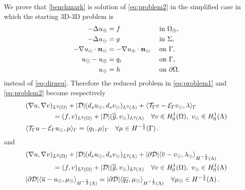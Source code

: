We prove that \eqref{benchmark} is solution of \eqref{eq:problem2} in the
simplified case in which the starting 3D-3D problem is
\begin{subequations}\label{eq:dirneu_simple}
\begin{align}
- \Delta u_{\oplus}  &= f  && \text{ in } \Omega_{\oplus},\\
- \Delta u_{\ominus} &= g  && \text{ in } \Sigma,\\
-\nabla u_{\ominus} \cdot \boldsymbol n_{\ominus} &= -\nabla u_{\oplus} \cdot \boldsymbol n_{\ominus}  && \text{ on } \Gamma,\\
u_{\ominus} - u_{\oplus} &= q_i  && \text{ on }  \Gamma,\\
u_{\oplus} &= h && \text{ on } \partial \Omega.
\end{align}
\end{subequations}
instead of \eqref{eq:dirneu}. Therefore the reduced problem in \eqref{eq:problem1} and
\eqref{eq:problem2} become respectively
%
\begin{subequations}\label{eq:problem1_simple}
\begin{align}
\label{eq:problem1_simple_eq1}
&(\nabla u,\nabla v)_{L^2(\Omega)} + |{\cal D}|(d_s \ud,d_s \vd)_{L^2(\Lambda)} 
+ \langle \trace{v}  - \ext{\vd}, \lambda \rangle_\Gamma
\\
\nonumber
&\qquad\qquad= (f,v)_{L^2(\Omega)} + |{\cal D}| (\avrd{g},\vd)_{L^2(\Lambda)}
\quad \forall v \in H^1_0(\Omega), \ \vd \in H^1_0(\Lambda)
\\
\label{eq:problem1_simple_eq2}
&   \langle \trace{u} - \ext{\ud} , \mu \rangle_\Gamma =  \langle q_1 , \mu \rangle_\Gamma
\quad \forall \mu \in H^{-\frac12}(\Gamma)\,.
\end{align}
\end{subequations}
and
\begin{subequations}\label{eq:problem2_simple}
  \begin{align}
    \label{eq:problem2_simple_eq1}
&(\nabla u,\nabla v)_{L^2(\Omega)} + |{\cal D}|(d_s \ud,d_s \vd)_{L^2(\Lambda)} 
+ |{\partial \cal D}| \langle \avrc{v} - \vd, \ld \rangle_{H^{-\frac12}(\Lambda)} 
\\
\nonumber
&\qquad\qquad= (f,v)_{L^2(\Omega)} + |{\cal D}| (\avrd{g}, \vd)_{L^2(\Lambda)}
\quad \forall v \in H^1_0(\Omega), \ \vd \in H^1_0(\Lambda)
\\
\label{eq:problem2_simple_eq2}
&  |\partial {\cal D}| \langle \avrc{u} -  \ud, \md \rangle_{H^{-\frac12}(\Lambda)} =
|\partial {\cal D}| \langle \avrc{q_2}, \md \rangle_{H^{-\frac12}(\Lambda)}
\quad \forall \md \in H^{-\frac12}(\Lambda)\,.
\end{align}
\end{subequations}

